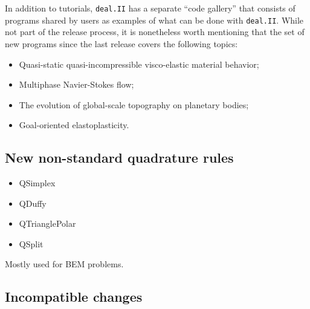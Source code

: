 \documentclass{ansarticle-preprint}
\newcommand{\specialword}[1]{\texttt{#1}}
\newcommand{\dealii}{{\specialword{deal.II}}}
\begin{document}
In addition to tutorials, \dealii{} has a separate ``code gallery'' that
consists of programs shared by users as examples of what can be
done with \dealii{}. While not part of the release process, it is nonetheless
worth mentioning that the set of new programs since the last release covers
the following topics:
  \begin{itemize}
    \item Quasi-static quasi-incompressible visco-elastic material behavior;
    \item Multiphase Navier-Stokes flow;
    \item The evolution of global-scale topography on planetary bodies;
    \item Goal-oriented elastoplasticity.
  \end{itemize}

\subsection{New non-standard quadrature rules}

\begin{itemize}
\item QSimplex
\item QDuffy
\item QTrianglePolar
\item QSplit
\end{itemize}

Mostly used for BEM problems.

\subsection{Incompatible changes}
\end{document}
